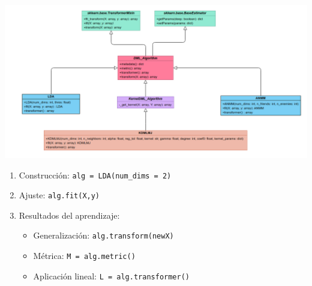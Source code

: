 \documentclass[10pt, compress]{beamer}
\begin{document}
\begin{frame}
  \begin{center}\includegraphics[height=0.5\textheight]{images/uml_pydml.png}\end{center}
  \begin{enumerate}
    \item Construcción: \texttt{alg = LDA(num\_dims = 2)}
    \item Ajuste: \texttt{alg.fit(X,y)}
    \item Resultados del aprendizaje:
      \begin{itemize}
        \item Generalización: \texttt{alg.transform(newX)}
        \item Métrica: \texttt{M = alg.metric()}
        \item Aplicación lineal: \texttt{L = alg.transformer()}
      \end{itemize}
  \end{enumerate}
\end{frame}
\end{document}
